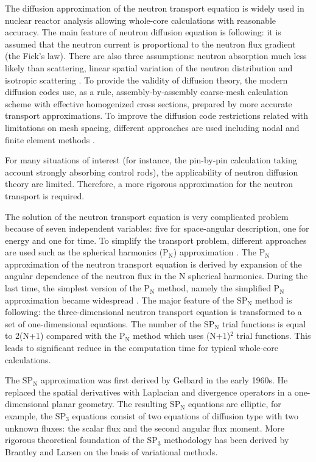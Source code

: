 \documentclass{crm-article}
\begin{document}
The diffusion approximation of the neutron transport equation is widely used in nuclear reactor analysis allowing whole-core calculations with reasonable accuracy. 
The main feature of neutron diffusion equation is following: it is assumed that the neutron current is proportional to the neutron flux gradient (the Fick’s law). 
There are also three assumptions: neutron absorption much less likely than scattering, linear spatial variation of the neutron distribution and isotropic scattering \cite{stacey2007}. 
To provide the validity of diffusion theory, the modern diffusion codes use, as a rule, assembly-by-assembly coarse-mesh calculation scheme with effective homogenized cross sections, prepared by more accurate transport approximations. 
To improve the diffusion code restrictions related with limitations on mesh spacing, different approaches are used including nodal and finite element methods \cite{avvakumov2017spectral, lawrence1986progress}.

For many situations of interest (for instance, the pin-by-pin calculation taking account strongly absorbing control rods), the applicability of neutron diffusion theory are limited. 
Therefore, a more rigorous approximation for the neutron transport is required.

The solution of the neutron transport equation is very complicated problem because of seven independent variables: five for space-angular description, one for energy and one for time. 
To simplify the transport problem, different approaches are used such as the spherical harmonics ($\mathrm{P_N}$) approximation \cite{azmy2010nuclear}. 
The $\mathrm{P_N}$ approximation of the neutron transport equation is derived by expansion of the angular dependence of the neutron flux in the N spherical harmonics. 
During the last time, the simplest version of the $\mathrm{P_N}$ method, namely the simplified $\mathrm{P_N}$ approximation became widespread \cite{mcclarren2010theoretical}. 
The major feature of the $\mathrm{SP_N}$ method is following: the three-dimensional neutron transport equation is transformed to a set of one-dimensional equations. 
The number of the $\mathrm{SP_N}$ trial functions is equal to 2(N+1) compared with the $\mathrm{P_N}$ method which uses (N+1)$^2$ trial functions. 
This leads to significant reduce in the computation time for typical whole-core calculations. 

The $\mathrm{SP_N}$ approximation was first derived by Gelbard \cite{gelbard1960application, gelbard1961simplified, gelbard1962applications} in the early 1960s. 
He replaced the spatial derivatives with Laplacian and divergence operators in a one-dimensional planar geometry. 
The resulting $\mathrm{SP_N}$ equations are elliptic, for example, the $\mathrm{SP_3}$ equations consist of two equations of diffusion type with two unknown fluxes: the scalar flux and the second angular flux moment. 
More rigorous theoretical foundation of the $\mathrm{SP_3}$ methodology has been derived by Brantley and Larsen \cite{brantley2000simplified} on the basis of variational methods.
\end{document}
